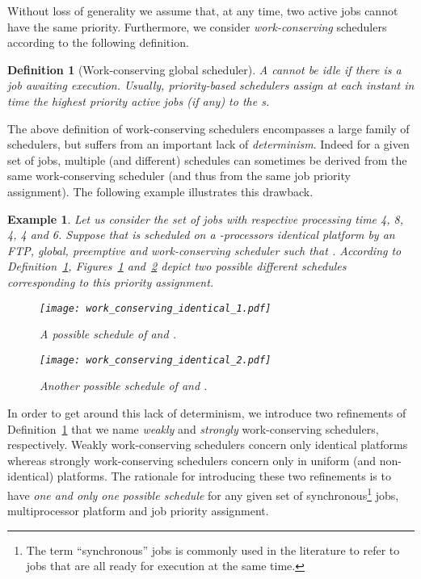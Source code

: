 \documentclass{article}
\newtheorem{Definition}{Definition}
\newtheorem{validity test}{Validity Test}
\newtheorem{Example}{Example}
\begin{document}
\noindent Without loss of generality we assume that, at any time, two active jobs cannot have the same priority. Furthermore, we consider \emph{work-conserving} schedulers according to the following definition.

\begin{Definition}[Work-conserving global scheduler]
\label{def:work-conserving}
A  cannot be idle if there is a job awaiting execution. Usually, priority-based schedulers assign at each instant in time the  highest priority active jobs (if any) to the  s.
\end{Definition}

The above definition of work-conserving schedulers encompasses a large family of schedulers, but suffers from an important lack of \emph{determinism}. Indeed for a given set of jobs, multiple (and different) schedules can sometimes be derived from the same work-conserving scheduler (and thus from the same job priority assignment). The following example illustrates this drawback.

\begin{Example}\label{scheduler_example}
Let us consider the set  of  jobs with respective processing time 4, 8, 4, 4 and 6.  Suppose that  is scheduled on a -processors identical platform  by an FTP, global, preemptive and \emph{work-conserving} scheduler such that . According to Definition~\ref{def:work-conserving}, Figures~\ref{fig:Multimode:ident_work_conserving_1} and~\ref{fig:Multimode:ident_work_conserving_2} depict two possible different schedules corresponding to this priority assignment. 
\begin{figure}[h]
\begin{center}
\texttt{[image: work\_conserving\_identical\_1.pdf]}
\caption{A possible schedule of  and .}
\label{fig:Multimode:ident_work_conserving_1}
\end{center}
\end{figure}

\begin{figure}[h]
\begin{center}
\texttt{[image: work\_conserving\_identical\_2.pdf]}
\caption{Another possible schedule of  and .}
\label{fig:Multimode:ident_work_conserving_2}
\end{center}
\end{figure}
\end{Example}

In order to get around this lack of determinism, we introduce two refinements of Definition~\ref{def:work-conserving} that we name \emph{weakly} and \emph{strongly} work-conserving schedulers, respectively. Weakly work-conserving schedulers concern only identical platforms whereas strongly work-conserving schedulers concern only in uniform (and non-identical) platforms. The rationale for introducing these two refinements is to have \emph{one and only one possible schedule} for any given set of synchronous\footnote{The term ``synchronous'' jobs is commonly used in the literature to refer to jobs that are all ready for execution at the same time.} jobs, multiprocessor platform and job priority assignment.  
\end{document}
